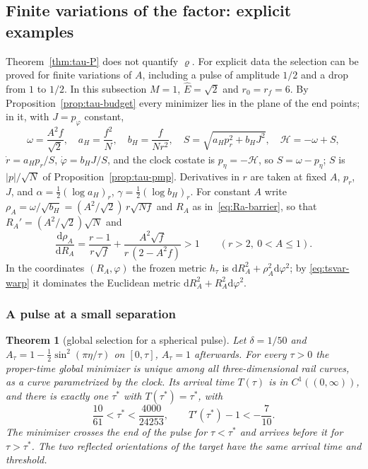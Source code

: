 \documentclass[aip,jmp,amsmath,amssymb,reprint]{revtex4-2}
\newcommand{\Ehat}{\hat E}
\newcommand{\dd}{\mathrm{d}}
\theoremstyle{plain}
\newtheorem{theorem}{Theorem}
\theoremstyle{definition}
\begin{document}
\subsection{Finite variations of the factor: explicit examples}
\label{sec:tau-var-finite}
Theorem~\ref{thm:tau-P} does not quantify $\varrho$. For explicit data the selection can be proved
for finite variations of $A$, including a pulse of amplitude $1/2$ and a drop from $1$ to $1/2$. In this
subsection $M=1$, $\Ehat=\sqrt2$ and $r_0=r_f=6$. By Proposition~\ref{prop:tau-budget} every minimizer
lies in the plane of the end points; in it, with $J=p_\varphi$ constant,
\[
  \omega=\frac{A^2f}{\sqrt2},\quad a_H=\frac{f^2}{N},\quad b_H=\frac f{Nr^2},\quad
  S=\sqrt{a_Hp_r^2+b_HJ^2},\quad \mathcal H=-\omega+S,
\]
$\dot r=a_Hp_r/S$, $\dot\varphi=b_HJ/S$, and the clock costate is $p_\eta=-\mathcal H$, so $S=\omega-p_\eta$; $S$ is
$|p|/\sqrt N$ of Proposition~\ref{prop:tau-pmp}. Derivatives in $r$ are taken at fixed $A$, $p_r$, $J$,
and $\alpha=\frac12(\log a_H)_r$, $\gamma=\frac12(\log b_H)_r$. For constant $A$ write
$\rho_A=\omega/\sqrt{b_H}=(A^2/\sqrt2)\,r\sqrt{Nf}$ and $R_A$ as in~\eqref{eq:Ra-barrier}, so that
$R_A'=(A^2/\sqrt2)\sqrt N$ and
\begin{equation}
  \frac{\dd\rho_A}{\dd R_A}=\frac{r-1}{r\sqrt f}+\frac{A^2\sqrt f}{r\,(2-A^2f)}>1\qquad(r>2,\ 0<A\le1).
  \label{eq:tsvar-warp}
\end{equation}
In the coordinates $(R_A,\varphi)$ the frozen metric $h_\tau$ is $\dd R_A^2+\rho_A^2\dd\varphi^2$; by
\eqref{eq:tsvar-warp} it dominates the Euclidean metric $\dd R_A^2+R_A^2\dd\varphi^2$.

\subsubsection*{A pulse at a small separation}
\begin{theorem}[global selection for a spherical pulse]\label{thm:tau-var-pulse}
Let $\delta=1/50$ and $A_\tau=1-\frac12\sin^2(\pi\eta/\tau)$ on $[0,\tau]$, $A_\tau=1$ afterwards. For every
$\tau>0$ the proper-time global minimizer is unique among all three-dimensional rail curves, as a curve
parametrized by the clock. Its arrival time $T(\tau)$ is in $C^1((0,\infty))$, and there is exactly one
$\tau^*$ with $T(\tau^*)=\tau^*$, with
\[
  \frac{10}{61}<\tau^*<\frac{4000}{24253},\qquad T'(\tau^*)-1<-\frac7{10}.
\]
The minimizer crosses the end of the pulse for $\tau<\tau^*$ and arrives before it for $\tau>\tau^*$. The two
reflected orientations of the target have the same arrival time and threshold.
\end{theorem}
\end{document}
